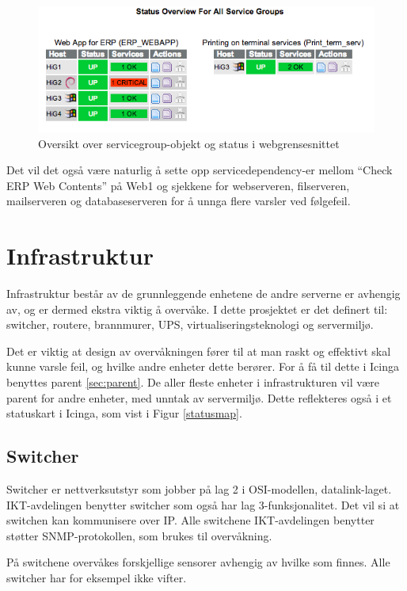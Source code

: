 \begin{figure}[H]
    \centering
    \includegraphics[scale=0.6]{img/servicegroup_web}
    \caption{ Oversikt over servicegroup-objekt og status i webgrensesnittet}
    \label{servicegroup_web}
\end{figure}
Det vil det også være naturlig å sette opp servicedependency-er mellom ``Check ERP Web Contents'' på Web1 og sjekkene for webserveren, filserveren, mailserveren og databaseserveren for å unnga flere varsler ved følgefeil.

\section{Infrastruktur}
Infrastruktur består av de grunnleggende enhetene de andre serverne er avhengig av, og er dermed ekstra viktig å overvåke. I dette prosjektet er det definert til: switcher, routere, brannmurer, UPS, virtualiseringsteknologi og servermiljø.

Det er viktig at design av overvåkningen fører til at man raskt og effektivt skal kunne varsle feil, og hvilke andre enheter dette berører. For å få til dette i Icinga benyttes parent \ref{sec:parent}. De aller fleste enheter i infrastrukturen vil være parent for andre enheter, med unntak av servermiljø. Dette reflekteres også i et statuskart i Icinga, som vist i Figur \ref{statusmap}.

\subsection{Switcher}\label{sec:switch}
Switcher er nettverksutstyr som jobber på lag 2 i OSI-modellen, datalink-laget. IKT-avdelingen benytter switcher som også har lag 3-funksjonalitet. Det vil si at switchen kan kommunisere over IP. Alle switchene IKT-avdelingen benytter støtter SNMP-protokollen, som brukes til overvåkning.

På switchene overvåkes forskjellige sensorer avhengig av hvilke som finnes. Alle switcher har for eksempel ikke vifter. 

